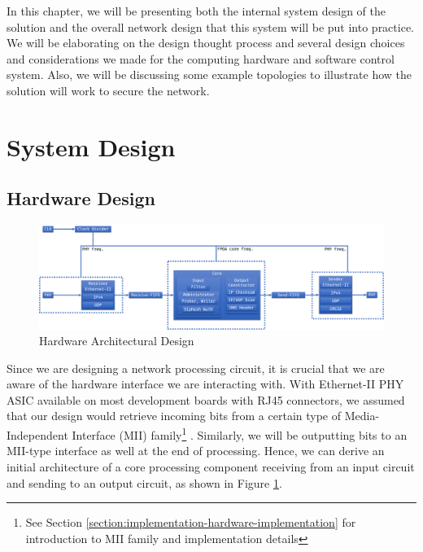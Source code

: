 \documentclass[a4paper]{report}
\begin{document}
In this chapter, we will be presenting both the internal system design of the solution and the overall network design that this system will be put into practice. We will be elaborating on the design thought process and several design choices and considerations we made for the computing hardware and software control system. Also, we will be discussing some example topologies to illustrate how the solution will work to secure the network.

\section{System Design}

\subsection{Hardware Design}
\label{section:design-system-design-hardware}

\begin{figure}[h!]
  \includegraphics[width=\textwidth]{imgs/hardware-design.png}
  \caption{Hardware Architectural Design}
  \label{fig:hardware-design}
\end{figure}

Since we are designing a network processing circuit, it is crucial that we are aware of the hardware interface we are interacting with. With Ethernet-II PHY ASIC available on most development boards with RJ45 connectors, we assumed that our design would retrieve incoming bits from a certain type of Media-Independent Interface (MII) family\footnote{See Section \ref{section:implementation-hardware-implementation} for introduction to MII family and implementation details} \cite{}. Similarly, we will be outputting bits to an MII-type interface as well at the end of processing. Hence, we can derive an initial architecture of a core processing component receiving from an input circuit and sending to an output circuit, as shown in Figure \ref{fig:hardware-design}.
\end{document}

